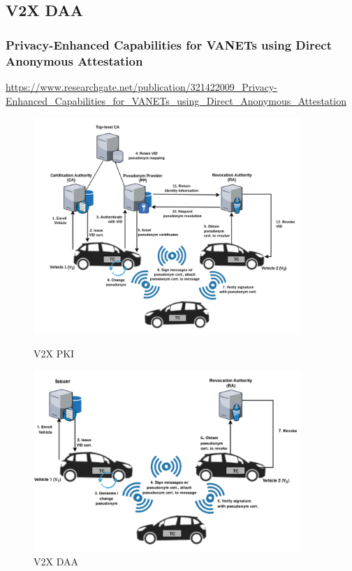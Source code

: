 \documentclass{ctexbeamer}
\begin{document}
\subsection{V2X DAA}
\begin{frame}
\frametitle{Privacy-Enhanced Capabilities for VANETs using Direct Anonymous Attestation}

    \url{https://www.researchgate.net/publication/321422009_Privacy-Enhanced_Capabilities_for_VANETs_using_Direct_Anonymous_Attestation}

    \begin{figure}[htbp]
        \centering
        \begin{minipage}[t]{0.48\textwidth}
            \centering
            \includegraphics[width=0.9\textwidth]{pic/v2x.pki.png}
           \caption{V2X PKI}
        \end{minipage}
        \begin{minipage}[t]{0.48\textwidth}
            \centering
            \includegraphics[width=0.9\textwidth]{pic/v2x.daa.png}
            \caption{V2X DAA}
        \end{minipage}
    \end{figure}

\end{frame}
\end{document}
